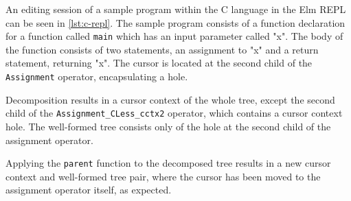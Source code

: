 An editing session of a sample program within the C language in the Elm
REPL can be seen in \cref{lst:c-repl}. The sample program consists of a function
declaration for a function called \texttt{main} which has an input
parameter called "x". The body of the function consists of two statements,
an assignment to "x" and a return statement, returning "x".
The cursor is located at the second child of the \texttt{Assignment} operator, encapsulating a hole.

Decomposition results in a cursor context of the whole tree, except
the second child of the \texttt{Assignment\_CLess\_cctx2} operator, which
contains a cursor context hole. The well-formed tree consists only
of the hole at the second child of the assignment operator.

Applying the \texttt{parent} function to the decomposed tree results in a 
new cursor context and well-formed tree pair, where the cursor has been moved 
to the assignment operator itself, as expected.

